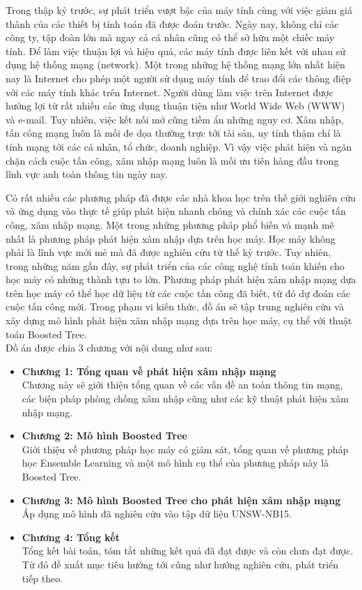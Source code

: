\pagestyle{plain}

Trong thập kỷ trước, sự phát triển vượt bậc của máy tính cùng với việc giảm giá thành của các thiết bị tính toán đã được đoán trước. Ngày nay, không chỉ các công ty, tập đoàn lớn mà ngay cả cá nhân cũng có thể sở hữu một chiếc máy tính. Để làm việc thuận lợi và hiệu quả, các máy tính được liên kết với nhau sử dụng hệ thống mạng (network). Một trong những hệ thống mạng lớn nhất hiện nay là Internet cho phép một người sử dụng máy tính để trao đổi các thông điệp với các máy tính khác trên Internet. Người dùng làm việc trên Internet được hưởng lợi từ rất nhiều các ứng dụng thuận tiện như World Wide Web (WWW) và e-mail. Tuy nhiên, việc kết nối mở cũng tiềm ẩn những nguy cơ. Xâm nhập, tấn công mạng luôn là mối đe dọa thường trực tới tài sản, uy tính thậm chí là tính mạng tới các cá nhân, tổ chức, doanh nghiệp. Vì vậy việc phát hiện và ngăn chặn cách cuộc tấn công, xâm nhập mạng luôn là mối ưu tiên hàng đầu trong lĩnh vực anh toàn thông tin ngày nay.

\indent Có rất nhiều các phương pháp đã được các nhà khoa học trên thế giới nghiên cứu và ứng dụng vào thực tế giúp phát hiện nhanh chóng và chính xác các cuộc tấn công, xâm nhập mạng. Một trong những phương pháp phổ biến và mạnh mẽ nhất là phương pháp phát hiện xâm nhập dựa trên học máy. Học máy không phải là lĩnh vực mới mẻ mà đã được nghiên cứu từ thế kỷ trước. Tuy nhiên, trong những năm gần đây, sự phát triển của các công nghệ tính toán khiến cho học máy có những thành tựu to lớn. Phương pháp phát hiện xâm nhập mạng dựa trên học máy có thể học dữ liệu từ các cuộc tấn công đã biết, từ đó dự đoán các cuộc tấn công mới. Trong phạm vi kiến thức, đồ án sẽ tập trung nghiên cứu và xây dựng mô hình phát hiện xâm nhập mạng dựa trên học máy, cụ thể với thuật toán Boosted Tree. \\

\indent Đồ án được chia 3 chương với nội dung như sau:
\begin{itemize}
    \item \textbf{Chương 1: Tổng quan về phát hiện xâm nhập mạng}\\ 
    Chương này sẽ giới thiệu tổng quan về các vấn đề an toàn thông tin mạng, các biện pháp phòng chống xâm nhập cũng như các kỹ thuật phát hiện xâm nhập mạng.
    \item \textbf{Chương 2: Mô hình Boosted Tree}\\
    Giới thiệu về phương pháp học máy có giám sát, tổng quan về phương pháp học Ensemble Learning và một mô hình cụ thể của phương pháp này là Boosted Tree.
    \item\textbf{ Chương 3: Mô hình Boosted Tree cho phát hiện xâm nhập mạng}\\
    Áp dụng mô hình đã nghiên cứu vào tập dữ liệu UNSW-NB15.
    \item \textbf{Chương 4: Tổng kết}\\
    Tổng kết bài toán, tóm tắt những kết quả đã đạt được và còn chưa đạt được. Từ đó đề xuất mục tiêu hướng tới cũng như hướng nghiên cứu, phát triển tiếp theo.
\end{itemize}